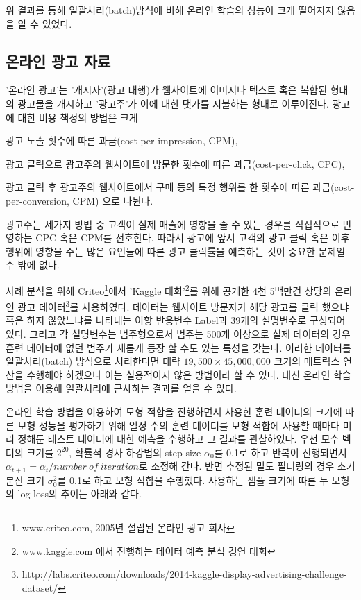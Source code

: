 \documentclass[oneside,b5paper,11pt]{book} %
\begin{document}
위 결과를 통해 일괄처리(batch)방식에 비해 온라인 학습의 성능이 크게 떨어지지 않음을 알 수 있었다.




\subsection{온라인 광고 자료}
 '온라인 광고'는 '개시자'(광고 대행)가 웹사이트에 이미지나 텍스트 혹은 복합된 형태의 광고물을 개시하고 '광고주'가 이에 대한 댓가를 지불하는 형태로 이루어진다. 광고에 대한 비용 책정의 방법은 크게
 \begin{inparaenum}[i)]
 \item 광고 노출 횟수에 따른 과금(cost-per-impression, CPM),
 \item 광고 클릭으로 광고주의 웹사이트에 방문한 횟수에 따른 과금(cost-per-click, CPC),
 \item 광고 클릭 후 광고주의 웹사이트에서 구매 등의 특정 행위를 한 횟수에 따른 과금(cost-per-conversion, CPM) 으로 나뉜다.
 \end{inparaenum}
 광고주는 세가지 방법 중 고객이 실제 매출에 영향을 줄 수 있는 경우를 직접적으로 반영하는 CPC 혹은 CPM를 선호한다. 따라서 광고에 앞서 고객의 광고 클릭 혹은 이후 행위에 영향을 주는 많은 요인들에 따른 광고 클릭률을 예측하는 것이 중요한 문제일 수 밖에 없다.\citep{Chapelle2013}
 
 사례 분석을 위해 Criteo\footnote{www.criteo.com, 2005년 설립된 온라인 광고 회사}에서 'Kaggle 대회'\footnote{www.kaggle.com 에서 진행하는 데이터 예측 분석 경연 대회}를 위해 공개한 4천 5백만건 상당의 온라인 광고 데이터\footnote{http://labs.criteo.com/downloads/2014-kaggle-display-advertising-challenge-dataset/}를 사용하였다. 데이터는 웹사이트 방문자가 해당 광고를 클릭 했으냐 혹은 하지 않았느냐를 나타내는 이항 반응변수 Label과 39개의 설명변수로 구성되어 있다. 그리고 각 설명변수는 범주형으로서 범주는 500개 이상으로 실제 데이터의 경우 훈련 데이터에 없던 범주가 새롭게 등장 할 수도 있는 특성을 갖는다. 이러한 데이터를 일괄처리(batch) 방식으로 처리한다면 대략 $19,500 \times 45,000,000$ 크기의 매트릭스 연산을 수행해야 하겠으나 이는 실용적이지 않은 방법이라 할 수 있다. 대신 온라인 학습 방법을 이용해 일괄처리에 근사하는 결과를 얻을 수 있다. 

 온라인 학습 방법을 이용하여 모형 적합을 진행하면서 사용한 훈련 데이터의 크기에 따른 모형 성능을 평가하기 위해 일정 수의 훈련 데이터를 모형 적합에 사용할 때마다 미리 정해둔 테스트 데이터에 대한 예측을 수행하고 그 결과를 관찰하였다. 우선 모수 벡터의 크기를 $2^{20}$, 확률적 경사 하강법의 step size $\alpha_0$를 0.1로 하고 반복이 진행되면서 $\alpha_{t+1} = {\alpha_{t}}/{number~ of~ iteration}$로 조정해 간다. 반면 추정된 밀도 필터링의 경우 초기 분산 크기 $\sigma_0^2$를 0.1로 하고 모형 적합을 수행했다. 사용하는 샘플 크기에 따른 두 모형의 log-loss의 추이는 아래와 같다.
\end{document}
